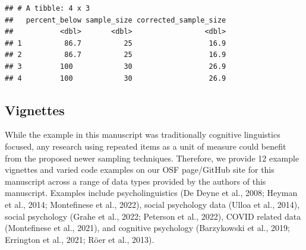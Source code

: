 \documentclass[
  man]{apa7}
\newenvironment{Shaded}{\begin{snugshade}}{\end{snugshade}}
\newcommand{\AttributeTok}[1]{\textcolor[rgb]{0.13,0.29,0.53}{#1}}
\newcommand{\CommentTok}[1]{\textcolor[rgb]{0.56,0.35,0.01}{\textit{#1}}}
\newcommand{\DecValTok}[1]{\textcolor[rgb]{0.00,0.00,0.81}{#1}}
\newcommand{\FunctionTok}[1]{\textcolor[rgb]{0.13,0.29,0.53}{\textbf{#1}}}
\newcommand{\NormalTok}[1]{#1}
\newcommand{\OtherTok}[1]{\textcolor[rgb]{0.56,0.35,0.01}{#1}}
\newcommand{\SpecialCharTok}[1]{\textcolor[rgb]{0.81,0.36,0.00}{\textbf{#1}}}
\begin{document}
\begin{Shaded}
\end{Shaded}

\begin{verbatim}
## # A tibble: 4 x 3
##   percent_below sample_size corrected_sample_size
##           <dbl>       <dbl>                 <dbl>
## 1          86.7          25                  16.9
## 2          86.7          25                  16.9
## 3         100            30                  26.9
## 4         100            30                  26.9
\end{verbatim}

\hypertarget{vignettes}{%
\subsection{Vignettes}\label{vignettes}}

While the example in this manuscript was traditionally cognitive linguistics focused, any research using repeated items as a unit of measure could benefit from the proposed newer sampling techniques. Therefore, we provide 12 example vignettes and varied code examples on our OSF page/GitHub site for this manuscript across a range of data types provided by the authors of this manuscript. Examples include psycholinguistics (De Deyne et al., 2008; Heyman et al., 2014; Montefinese et al., 2022), social psychology data (Ulloa et al., 2014), social psychology (Grahe et al., 2022; Peterson et al., 2022), COVID related data (Montefinese et al., 2021), and cognitive psychology (Barzykowski et al., 2019; Errington et al., 2021; Röer et al., 2013).
\end{document}
